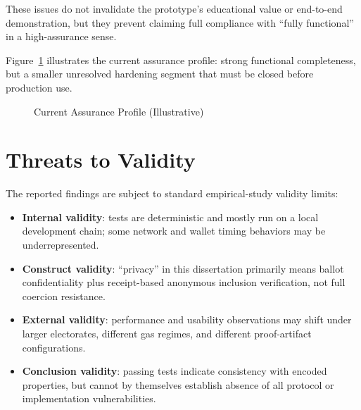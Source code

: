 These issues do not invalidate the prototype's educational value or end-to-end demonstration, but they prevent claiming full compliance with ``fully functional'' in a high-assurance sense.

Figure~\ref{fig:assurance-gap} illustrates the current assurance profile: strong functional completeness, but a smaller unresolved hardening segment that must be closed before production use.

\begin{figure}[htbp]
\centering
{}
\caption{Current Assurance Profile (Illustrative)}
\label{fig:assurance-gap}
\end{figure}

\section{Threats to Validity}

The reported findings are subject to standard empirical-study validity limits:
\begin{itemize}
    \item \textbf{Internal validity}: tests are deterministic and mostly run on a local development chain; some network and wallet timing behaviors may be underrepresented.
    \item \textbf{Construct validity}: ``privacy'' in this dissertation primarily means ballot confidentiality plus receipt-based anonymous inclusion verification, not full coercion resistance.
    \item \textbf{External validity}: performance and usability observations may shift under larger electorates, different gas regimes, and different proof-artifact configurations.
    \item \textbf{Conclusion validity}: passing tests indicate consistency with encoded properties, but cannot by themselves establish absence of all protocol or implementation vulnerabilities.
\end{itemize}

